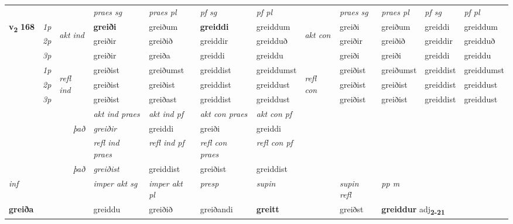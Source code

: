 \begin{longtable}[l]{X>{\footnotesize\itshape}llXXXXlXXXX}
\midrule

 & &   & \textit{praes sg}  & \textit{praes pl}    & \textit{ pf sg} & \textit{pf pl} & & \textit{praes sg}  & \textit{praes pl}    & \textit{pf sg} & \textit{pf pl }  \\ \cmidrule{4-7} \cmidrule{9-12}
 \multirow{2}{*}{{{\textbf{v{\textsubscript{2}}} \Large{\textbf{168}}}}}  & 1p & \multirow{3}{*}{\begin{turn}{90}\textit{akt ind}\end{turn}} & \textbf{greiði} & greiðum & \textbf{greiddi} & greiddum & \multirow{3}{*}{\begin{turn}{90}\textit{akt con}\end{turn}} &greiði & greiðum & greiddi & greiddum\\*
 & 2p &  &  greiðir  & greiðið & greiddir & greidduð & & greiðir & greiðið & greiddir & greidduð \\*
 & 3p &  & greiðir & greiða & greiddi & greiddu & & greiði & greiði& greiddi & greiddu \\*
\cmidrule{4-7} \cmidrule{9-12}
 & 1p & \multirow{3}{*}{\begin{turn}{90}\textit{refl ind}\end{turn}}  & greiðist & greiðumst & greiddist & greiddumst & \multirow{3}{*}{\begin{turn}{90}\textit{refl con}\end{turn}}  &greiðist & greiðumst & greiddist & greiddumst \\*
 & 2p &  & greiðist & greiðist & greiddist & greiddust & &greiðist & greiðist & greiddist & greiddust \\*
 & 3p  & & greiðist & greiðast & greiddist & greiddust & & greiðist & greiðist& greiddist & greiddust \\*
\cmidrule{4-7} \cmidrule{9-12}

   && &  \textit{akt ind praes} & \textit{akt ind pf} & \textit{akt con praes} & \textit{akt con pf} \\*
\multicolumn{3}{r}{\textit{það}} & greiðir & greiddi & greiði & greiddi \\*

\cmidrule{4-7}
 & && \textit{refl ind praes} & \textit{refl ind pf} & \textit{refl con praes} & \textit{refl con pf} \\*
\multicolumn{3}{r}{\textit{það}}& greiðist & greiddist & greiðist & greiddist \\*

\cmidrule{4-7}
   {\textit{inf}} & &  & \textit{imper akt sg} & \textit{imper akt pl}   & \textit{presp} & \textit{supin} && \textit{supin refl} & \textit{pp m} \\*
  {\textbf{greiða}} & && greiddu  & greiðið   & greiðandi &  \textbf{greitt} && greiðst & \multicolumn{2}{l}{\textbf{greiddur} adj\textbf{\textsubscript{2-21}}} \\*


\end{longtable}
